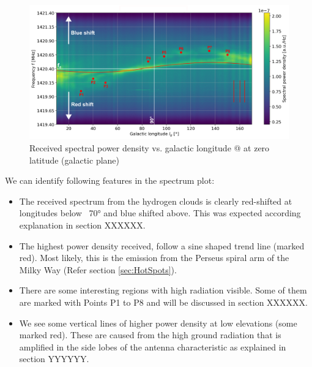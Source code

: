 \begin{figure}[H]
    \centering
    \includegraphics[width=\textwidth]{assets/spectrum_plot_edit.png}
    \caption{Received spectral power density vs. galactic longitude @ at zero latitude (galactic plane)}
    \label{fig:mw_spectrum_plot}
\end{figure}

We can identify following features in the spectrum plot:

\begin{itemize}
    \item The received spectrum from the hydrogen clouds is clearly red-shifted at longitudes below ~70° and blue shifted above. This was expected according explanation in section XXXXXX.
    \item The highest power density received, follow a sine shaped trend line (marked red). Most likely, this is the emission from the Perseus spiral arm of the Milky Way (Refer section \ref{sec:HotSpots}).
    \item There are some interesting regions with high radiation visible. Some of them are marked with Points P1 to P8 and will be discussed in section XXXXXX.
    \item We see some vertical lines of higher power density at low elevations (some marked red). These are caused from the high ground radiation that is amplified in the side lobes of the antenna characteristic as explained in section YYYYYY.
\end{itemize}



